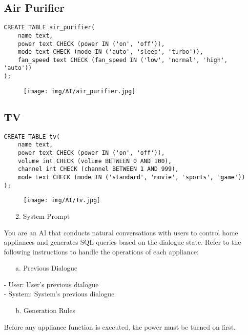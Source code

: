 \documentclass[conference]{IEEEtran}
\begin{document}
\subsection*{Air Purifier}
\begin{lstlisting}
CREATE TABLE air_purifier(
    name text,
    power text CHECK (power IN ('on', 'off')),
    mode text CHECK (mode IN ('auto', 'sleep', 'turbo')),
    fan_speed text CHECK (fan_speed IN ('low', 'normal', 'high', 'auto'))
);
\end{lstlisting}

\begin{figure}[h]
\hspace{1.5cm}
\centering
\begin{minipage}{0.8\columnwidth}
    \texttt{[image: img/AI/air\_purifier.jpg]}
\end{minipage}
\end{figure}

\subsection*{TV}
\begin{lstlisting}
CREATE TABLE tv(
    name text,
    power text CHECK (power IN ('on', 'off')),
    volume int CHECK (volume BETWEEN 0 AND 100),
    channel int CHECK (channel BETWEEN 1 AND 999),
    mode text CHECK (mode IN ('standard', 'movie', 'sports', 'game'))
);
\end{lstlisting}
\begin{figure}[h]
\hspace{1.5cm}
\centering
\begin{minipage}{0.8\columnwidth}
    \texttt{[image: img/AI/tv.jpg]}
\end{minipage}
\end{figure}

\begin{itemize}
    \item[2.] System Prompt
\end{itemize}
You are an AI that conducts natural conversations with users to control home appliances and generates SQL queries based on the dialogue state. Refer to the following instructions to handle the operations of each appliance: \\

\begin{enumerate}

\begin{itemize}
    \item[a.] Previous Dialogue
\end{itemize}
- User: {User's previous dialogue} \\
- System: {System's previous dialogue} \\

\begin{itemize}
    \item[b.] Generation Rules
\end{itemize}
Before any appliance function is executed, the power must be turned on first. \\ \\

\end{enumerate}
\end{document}
